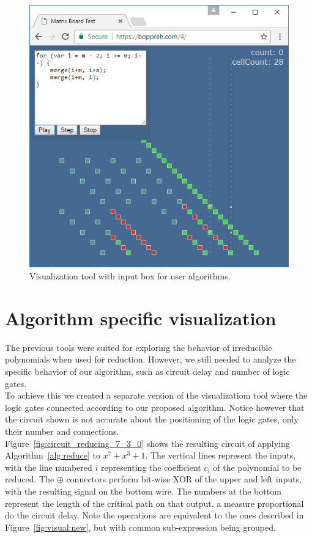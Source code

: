 \begin{figure}
  \caption{Visualization tool with input box for user algorithms.}
  \label{fig:source}
  \centering
  \includegraphics[width = .7\columnwidth]{figures/source.png}
\end{figure}


\section{Algorithm specific visualization}

The previous tools were suited for exploring the behavior of irreducible polynomials when used for reduction. However, we still needed to analyze the specific behavior of our algorithm, such as circuit delay and number of logic gates. \\

To achieve this we created a separate version of the visualizatiom tool where the logic gates connected according to our proposed algorithm. Notice however that the circuit shown is not accurate about the positioning of the logic gates, only their number and connections. \\

Figure~\ref{fig:circuit_reducing_7_3_0} shows the resulting circuit of applying Algorithm~\ref{alg:reduce} to $x^7 + x^3 + 1$. The vertical lines represent the inputs, with the line numbered $i$ representing the coefficient $c_i$ of the polynomial to be reduced. The $\oplus$  connectors perform bit-wise XOR of the upper and left inputs, with the resulting signal on the bottom wire. The numbers at the bottom represent the length of the critical path on that output, a measure proportional do the circuit delay. Note the operations are equivalent to the ones described in Figure~\ref{fig:visual:new}, but with common sub-expression being grouped. \\

